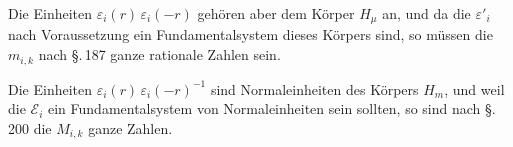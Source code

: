 Die Einheiten $\varepsilon_i(r)\, \varepsilon_i(-r)$ gehören aber dem Körper $H_\mu$
an, und da die $\varepsilon'_i$ nach Voraussetzung ein Fundamentalsystem
dieses Körpers sind, so müssen die $m_{i,k}$ nach \S.\,187 ganze rationale
 Zahlen sein.

Die Einheiten $\varepsilon_i(r)\, \varepsilon_i(-r)^{-1}$ sind Normaleinheiten des Körpers
 $H_m$, und weil die $\mathcal{E}_i$ ein Fundamentalsystem von Normaleinheiten
 sein sollten, so sind nach \S.\,200 die $M_{i,k}$ ganze Zahlen.
